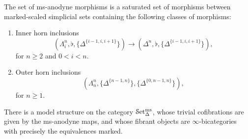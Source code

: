 \documentclass[main.tex]{subfiles}
\begin{document}
\begin{definition}
  \label{def:ms-anodyne_morphisms}
  The set of ms-anodyne morphisms is a saturated set of morphisms between marked-scaled simplicial sets containing the following classes of morphisms:
  \begin{enumerate}[label=(A\arabic*)]
    \item\label{item:innerms} Inner horn inclusions
      \begin{equation*}
        (\Lambda^{n}_{i}, \flat, \{\Delta^{\{i-1,i,i+1\}}\}) \to (\Delta^{n}, \flat, \{\Delta^{\{i-1,i,i+1\}}\}),
      \end{equation*}
      for $n \geq 2$ and $0 < i < n$.

    \item\label{item:outerms} Outer horn inclusions
      \begin{equation*}
        (\Lambda^{n}_{n}, \{\Delta^{\{n-1,n\}}\}, \{\Delta^{\{0, n-1, n\}}\}),
      \end{equation*}
      for $n \geq 1$.
  \end{enumerate}
\end{definition}

\begin{theorem}
  There is a model structure on the category $\mathcal{S}\mathrm{et}_{\Delta}^{\mathrm{ms}}$, whose trivial cofibrations are given by the ms-anodyne maps, and whose fibrant objects are $\infty$-bicategories with precisely the equivalences marked.
\end{theorem}
\end{document}
